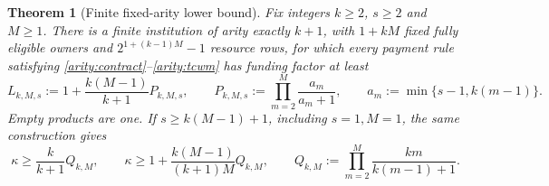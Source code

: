 \documentclass[11pt]{article}
\newtheorem{theorem}{Theorem}[section]
\theoremstyle{definition}\newtheorem{definition}[theorem]{Definition}
\theoremstyle{remark}\newtheorem{remark}[theorem]{Remark}
\begin{document}
\begin{theorem}[Finite fixed-arity lower bound]
\label{arity:finite-bound}
Fix integers $k\geq2$, $s\geq2$ and $M\geq1$.  There is a finite institution
of arity exactly $k+1$, with $1+kM$ fixed fully eligible owners and
$2^{1+(k-1)M}-1$ resource rows, for which every payment rule satisfying
\eqref{arity:contract}--\eqref{arity:tcwm} has funding factor at least
\begin{equation}
  L_{k,M,s}
  :=1+\frac{k(M-1)}{k+1}P_{k,M,s},\qquad
  P_{k,M,s}:=\prod_{m=2}^{M}\frac{a_m}{a_m+1},\qquad
  a_m:=\min\{s-1,k(m-1)\}.
  \label{arity:finite-tail}
\end{equation}
Empty products are one.  If $s\geq k(M-1)+1$, including $s=1,M=1$, the
same construction gives
\begin{equation}
  \kappa\geq\frac{k}{k+1}Q_{k,M},\qquad
  \kappa\geq1+\frac{k(M-1)}{(k+1)M}Q_{k,M},\qquad
  Q_{k,M}:=\prod_{m=2}^{M}\frac{km}{k(m-1)+1}.
  \label{arity:untruncated}
\end{equation}
\end{theorem}
\end{document}
